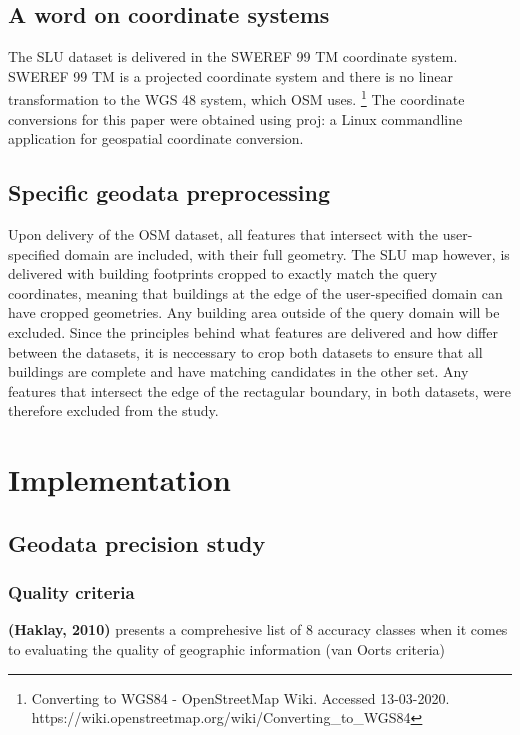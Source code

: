 \documentclass{kththesis}
\begin{document}
\section{A word on coordinate systems}

The SLU dataset is delivered in the SWEREF 99 TM coordinate system.
SWEREF 99 TM is a projected coordinate system and there is no linear transformation to the WGS 48 system, which OSM uses. \footnote{Converting to WGS84 - OpenStreetMap Wiki. Accessed 13-03-2020. https://wiki.openstreetmap.org/wiki/Converting\_to\_WGS84}
The coordinate conversions for this paper were obtained using proj: a Linux commandline application for geospatial coordinate conversion.

\section{Specific geodata preprocessing}

Upon delivery of the OSM dataset, all features that intersect with the user-specified domain are included, with their full geometry.
The SLU map however, is delivered with building footprints cropped to exactly match the query coordinates, meaning that buildings at the edge of the user-specified domain can have cropped geometries.
Any building area outside of the query domain will be excluded.
Since the principles behind what features are delivered and how differ between the datasets, it is neccessary to crop both datasets to ensure that all buildings are complete and have matching candidates in the other set.
Any features that intersect the edge of the rectagular boundary, in both datasets, were therefore excluded from the study.

\chapter{Implementation}

\section{Geodata precision study}

\subsection{Quality criteria}

\textbf{(Haklay, 2010)} presents a comprehesive list of 8 accuracy classes when it comes to evaluating the quality of geographic information (van Oorts criteria)
\end{document}
